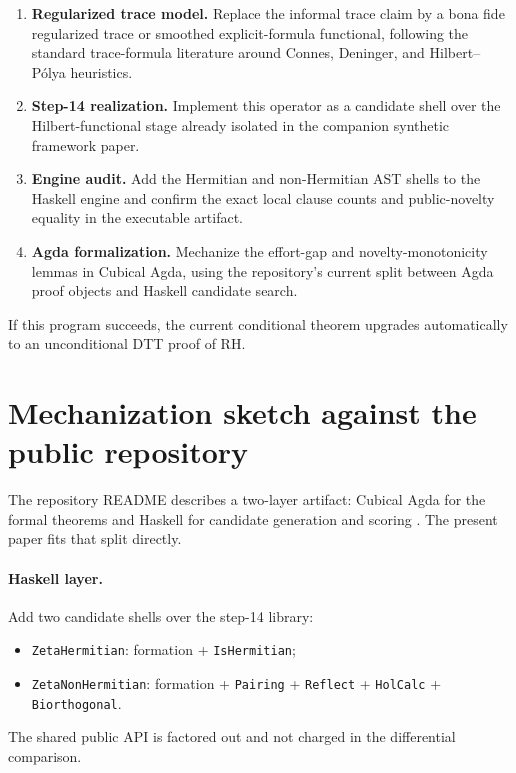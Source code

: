 \documentclass[11pt,a4paper]{article}
\theoremstyle{plain}
\theoremstyle{definition}
\theoremstyle{remark}
\begin{document}
\begin{enumerate}[leftmargin=2em]
  \item \textbf{Regularized trace model.} Replace the informal trace claim by a bona fide regularized trace or smoothed explicit-formula functional, following the standard trace-formula literature around Connes, Deninger, and Hilbert--P\'olya heuristics.
  \item \textbf{Step-14 realization.} Implement this operator as a candidate shell over the Hilbert-functional stage already isolated in the companion synthetic framework paper.
  \item \textbf{Engine audit.} Add the Hermitian and non-Hermitian AST shells to the Haskell engine and confirm the exact local clause counts and public-novelty equality in the executable artifact.
  \item \textbf{Agda formalization.} Mechanize the effort-gap and novelty-monotonicity lemmas in Cubical Agda, using the repository's current split between Agda proof objects and Haskell candidate search.
\end{enumerate}

If this program succeeds, the current conditional theorem upgrades automatically to an unconditional DTT proof of RH.

\section{Mechanization sketch against the public repository}

The repository README describes a two-layer artifact: Cubical Agda for the formal theorems and Haskell for candidate generation and scoring \citep{penrepo}. The present paper fits that split directly.

\paragraph{Haskell layer.}
Add two candidate shells over the step-14 library:
\begin{itemize}[leftmargin=2em]
  \item \texttt{ZetaHermitian}: formation + \texttt{IsHermitian};
  \item \texttt{ZetaNonHermitian}: formation + \texttt{Pairing} + \texttt{Reflect} + \texttt{HolCalc} + \texttt{Biorthogonal}.
\end{itemize}
The shared public API is factored out and not charged in the differential comparison.
\end{document}
